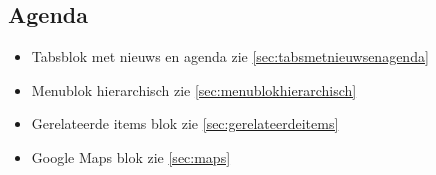 \subsection{Agenda}
\label{sec:agenda}

\begin{itemize}
  \item Tabsblok met nieuws en agenda zie \ref{sec:tabsmetnieuwsenagenda}
  \item Menublok hierarchisch zie \ref{sec:menublokhierarchisch}
  \item Gerelateerde items blok zie \ref{sec:gerelateerdeitems}
  \item Google Maps blok zie \ref{sec:maps}  
\end{itemize}
